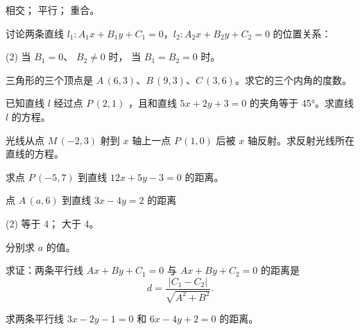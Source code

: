 \begin{Exercise}
\begin{question}
\begin{tasks}
      \task 相交；
      \task 平行；
      \task 重合。
    \end{tasks}
    \item 讨论两条直线 $l_1:A_1x+B_1y+C_1=0$，$l_2:A_2x+B_2y+C_2=0$ 的位置关系：
    \begin{tasks}(2)
      \task 当 $B_1=0$、 $B_2\neq0$ 时，
      \task 当 $B_1=B_2=0$ 时。
    \end{tasks}
    \item 三角形的三个顶点是 $A\,(6,3)$、$B\,(9,3)$、$C\,(3,6)$。求它的三个内角的度数。
    \item 已知直线 $l$ 经过点 $P\,(2,1)$ ，且和直线 $5x+2y+3=0$ 的夹角等于 \ang{45}。求直线 $l$ 的方程。
    \item 光线从点 $M\,(-2,3)$ 射到 $x$ 轴上一点 $P\,(1,0)$ 后被 $x$ 轴反射。求反射光线所在直线的方程。
    \item 求点 $P\,(-5,7)$ 到直线 $12x+5y-3=0$ 的距离。
    \item 点 $A\,(a,6)$ 到直线 $3x-4y=2$ 的距离
    \begin{tasks}(2)
      \task 等于 4；
      \task 大于 4。
    \end{tasks}
    分别求 $a$ 的值。
    \item 求证：两条平行线 $Ax+By+C_1=0$ 与 $Ax+By+C_2=0$ 的距离是
    \[ d = \frac{|C_1-C_2|}{\sqrt{A^2+B^2}}. \]
    \item 求两条平行线 $3x-2y-1=0$ 和 $6x-4y+2=0$ 的距离。
  \end{question}
\end{Exercise}

